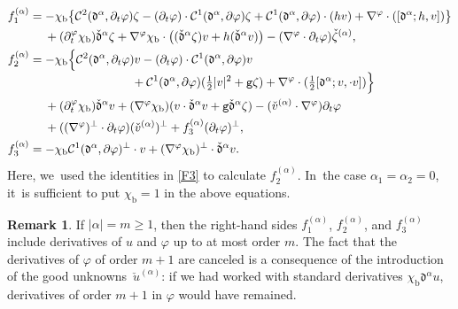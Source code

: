 \documentclass[JEP,XML,SOM,Unicode,NoFloatCountersInSection,published]{cedram}
\newcommand{\gr}{{\mathtt g}}
\newcommand{\dt}{\partial_t}
\newcommand{\cmfalpha}{\check{\mathfrak{d}}^{\alpha}}
\theoremstyle{definition}
\newtheorem{remark}[theorem]{Remark}
\begin{document}
\begin{align*}
f_1^{(\alpha)}
&= - \chi_\mathrm{b}\bigl\{ {\mathcal C}^2(\mathfrak{d}^\alpha,\dt \varphi)\zeta
- (\dt\varphi)\cdot {\mathcal C}^1(\mathfrak{d}^\alpha,\partial\varphi)\zeta
+ {\mathcal C}^1(\mathfrak{d}^\alpha,\partial\varphi)\cdot(hv)
+ \nabla^\varphi\cdot([\mathfrak{d}^\alpha;h,v]) \bigr\} \\
&\quad\;
+ (\dt^\varphi\chi_\mathrm{b}) \cmfalpha \zeta
+ \nabla^\varphi\chi_\mathrm{b}\cdot\bigl((\cmfalpha \zeta)v + h (\cmfalpha v) \bigr)
- (\nabla^\varphi\cdot\dt\varphi)\check{\zeta}^{(\alpha)}, \\
f_2^{(\alpha)}
&= -\chi_\mathrm{b}\Bigl\{ {\mathcal C}^2(\mathfrak{d}^\alpha,\dt \varphi) v
- (\dt\varphi)\cdot {\mathcal C}^1(\mathfrak{d}^\alpha,\partial\varphi)v\\[-3pt]
&\hspace*{3cm}+ {\mathcal C}^1(\mathfrak{d}^\alpha,\partial\varphi) (\tfrac12|v|^2+\gr\zeta)
+ \nabla^\varphi\cdot(\tfrac12[\mathfrak{d}^\alpha;v,\cdot v]) \Bigr\}\\
&\quad\;+ (\dt^\varphi\chi_\mathrm{b}) \cmfalpha v
+ (\nabla^\varphi\chi_\mathrm{b})(v\cdot\cmfalpha v + \gr\cmfalpha\zeta)- (\check{v}^{(\alpha)}\cdot\nabla^\varphi)\dt\varphi  \\
&\quad\;
+ ((\nabla^\varphi)^\perp\cdot\dt\varphi)(\check{v}^{(\alpha)})^\perp
+ f_3^{(\alpha)}(\dt\varphi)^\perp, \\
f_3^{(\alpha)}
&= -\chi_\mathrm{b} {\mathcal C}^1(\mathfrak{d}^\alpha,\partial\varphi)^\perp \cdot v
+ (\nabla^\varphi\chi_\mathrm{b})^\perp\cdot \cmfalpha v.
\end{align*}
Here, we~used the identities in \eqref{F3} to calculate $f_2^{(\alpha)}$. In~the case $\alpha_1=\alpha_2=0$, it~is sufficient to put $\chi_\mathrm{b}=1$ in the above equations.

\begin{remark}\label{re:GU1}
If $|\alpha|=m\geq1$, then the right-hand sides $f_1^{(\alpha)}$, $f_2^{(\alpha)}$, and $f_3^{(\alpha)}$ include derivatives of $u$ and $\varphi$
up to at most order $m$.
The fact that the derivatives of $\varphi$ of order $m+1$ are canceled is a consequence of the introduction of the good unknowns~$\check{u}^{(\alpha)}$:
if we had worked with standard derivatives $\chi_\mathrm{b}\mathfrak{d}^\alpha u$, derivatives of order $m+1$ in $\varphi$ would have remained.
\end{remark}
\end{document}
